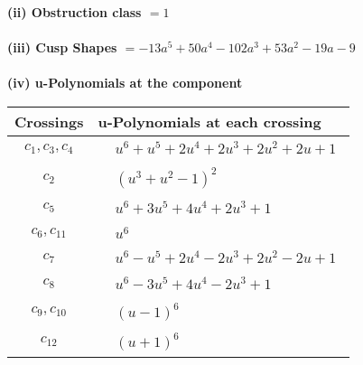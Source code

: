 \documentclass[1p]{elsarticle_modified}
\theoremstyle{definition}
\begin{document}
\flushleft \textbf{(ii) Obstruction class $= 1$}\\~\\
\flushleft \textbf{(iii) Cusp Shapes $= -13 a^5+50 a^4-102 a^3+53 a^2-19 a-9$}\\~\\
\newpage\renewcommand{\arraystretch}{1}
\flushleft \textbf{(iv) u-Polynomials at the component}\newline \\
\begin{tabular}{m{50pt}|m{274pt}}
Crossings & \hspace{64pt}u-Polynomials at each crossing \\
\hline $$\begin{aligned}c_{1},c_{3},c_{4}\end{aligned}$$&$\begin{aligned}
&u^6+u^5+2 u^4+2 u^3+2 u^2+2 u+1
\end{aligned}$\\
\hline $$\begin{aligned}c_{2}\end{aligned}$$&$\begin{aligned}
&(u^3+u^2-1)^2
\end{aligned}$\\
\hline $$\begin{aligned}c_{5}\end{aligned}$$&$\begin{aligned}
&u^6+3 u^5+4 u^4+2 u^3+1
\end{aligned}$\\
\hline $$\begin{aligned}c_{6},c_{11}\end{aligned}$$&$\begin{aligned}
&u^6
\end{aligned}$\\
\hline $$\begin{aligned}c_{7}\end{aligned}$$&$\begin{aligned}
&u^6- u^5+2 u^4-2 u^3+2 u^2-2 u+1
\end{aligned}$\\
\hline $$\begin{aligned}c_{8}\end{aligned}$$&$\begin{aligned}
&u^6-3 u^5+4 u^4-2 u^3+1
\end{aligned}$\\
\hline $$\begin{aligned}c_{9},c_{10}\end{aligned}$$&$\begin{aligned}
&(u-1)^6
\end{aligned}$\\
\hline $$\begin{aligned}c_{12}\end{aligned}$$&$\begin{aligned}
&(u+1)^6
\end{aligned}$\\
\hline
\end{tabular}\\~\\
\end{document}
